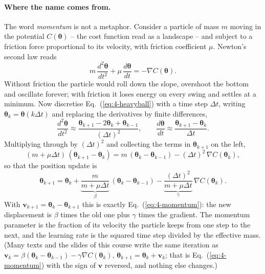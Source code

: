 \paragraph{Where the name comes from.}
The word \emph{momentum} is not a metaphor.  Consider a particle of mass $m$
moving in the potential $C(\bm{\theta})$ -- the cost function read as a
landscape -- and subject to a friction force proportional to its velocity,
with friction coefficient $\mu$.  Newton's second law reads
\begin{equation}
  m\,\frac{d^{2}\bm{\theta}}{dt^{2}} + \mu\,\frac{d\bm{\theta}}{dt}
  = -\nabla C(\bm{\theta}) .
  \label{eq:4-heavyball}
\end{equation}
Without friction the particle would roll down the slope, overshoot the
bottom and oscillate forever; with friction it loses energy on every swing
and settles at a minimum.  Now discretise Eq.~(\ref{eq:4-heavyball}) with
a time step $\Delta t$, writing $\bm{\theta}_k=\bm{\theta}(k\Delta t)$ and
replacing the derivatives by finite differences,
\begin{equation*}
  \frac{d^{2}\bm{\theta}}{dt^{2}}\approx
  \frac{\bm{\theta}_{k+1}-2\bm{\theta}_k+\bm{\theta}_{k-1}}{(\Delta t)^{2}},
  \qquad
  \frac{d\bm{\theta}}{dt}\approx
  \frac{\bm{\theta}_{k+1}-\bm{\theta}_k}{\Delta t}.
\end{equation*}
Multiplying through by $(\Delta t)^{2}$ and collecting the terms in
$\bm{\theta}_{k+1}$ on the left,
\begin{equation*}
  (m+\mu\Delta t)\,(\bm{\theta}_{k+1}-\bm{\theta}_k)
  = m\,(\bm{\theta}_k-\bm{\theta}_{k-1})
    - (\Delta t)^{2}\,\nabla C(\bm{\theta}_k),
\end{equation*}
so that the position update is
\begin{equation}
  \bm{\theta}_{k+1} = \bm{\theta}_k
  + \underbrace{\frac{m}{m+\mu\Delta t}}_{\beta}\,
    (\bm{\theta}_k-\bm{\theta}_{k-1})
  - \underbrace{\frac{(\Delta t)^{2}}{m+\mu\Delta t}}_{\gamma}\,
    \nabla C(\bm{\theta}_k) .
  \label{eq:4-heavyballdiscrete}
\end{equation}
With $\bm{v}_{k+1}=\bm{\theta}_k-\bm{\theta}_{k+1}$ this is exactly
Eq.~(\ref{eq:4-momentum}): the new displacement is $\beta$ times the old
one plus $\gamma$ times the gradient.  The momentum parameter is the
fraction of its velocity the particle keeps from one step to the next,
and the learning rate is the squared time step divided by the effective
mass.  (Many texts and the slides of this course write the same iteration
as $\bm{v}_{k}=\beta(\bm{\theta}_k-\bm{\theta}_{k-1})-\gamma\nabla
C(\bm{\theta}_k)$, $\bm{\theta}_{k+1}=\bm{\theta}_k+\bm{v}_k$; that is
Eq.~(\ref{eq:4-momentum}) with the sign of $\bm{v}$ reversed, and nothing
else changes.)

